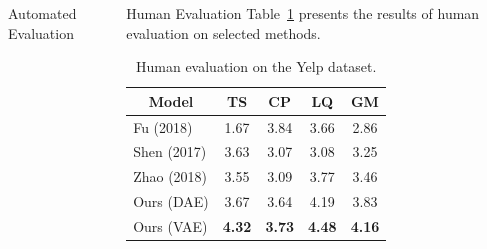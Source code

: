 \documentclass[final]{beamer}
\newlength{\onecolwid}
\newlength{\twocolwid}
\newcommand{\tabc}[2]{\multicolumn{1}{c}{\multirow{#1}{*}{\textbf{#2}}}}
\begin{document}
\begin{frame}[t]
\begin{columns}[t]
\begin{column}{\twocolwid}
\begin{columns}[t,totalwidth=\twocolwid]
\begin{column}{\onecolwid}
\begin{block}{Automated Evaluation}
                    \end{block}


                \end{column} %

                \begin{column}{\onecolwid} %

                    \begin{block}{Human Evaluation}
                        Table~\ref{tab:human-evaluation} presents the results of human evaluation on selected methods.

                        \begin{table}[ht]
                            \centering
                            \begin{tabular}{ l c c c c }
                                \tabc{1}{Model} & \textbf{TS}       & \textbf{CP}       & \textbf{LQ}       & \textbf{GM}       \\
                                \hline
                                Fu (2018)       & \color{gray} 1.67 & \color{gray} 3.84 & \color{gray} 3.66 & \color{gray} 2.86 \\
                                Shen (2017)     & 3.63              & 3.07              & 3.08              & 3.25              \\
                                Zhao (2018)     & 3.55              & 3.09              & 3.77              & 3.46              \\
                                Ours (DAE)      & 3.67              & 3.64              & 4.19              & 3.83              \\
                                Ours (VAE)      & \textbf{4.32}     & \textbf{3.73}     & \textbf{4.48}     & \textbf{4.16}     \\
                            \end{tabular}
                            \caption{Human evaluation on the Yelp dataset.}
                            \label{tab:human-evaluation}
                        \end{table}
                    \end{block}

                    \vspace{-1.6cm}


\end{column}
\end{columns}
\end{column}
\end{columns}
\end{frame}
\end{document}
